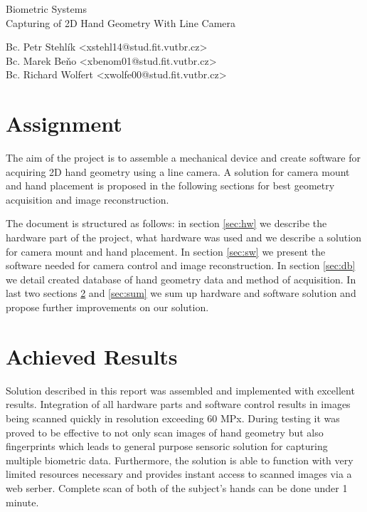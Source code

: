 \documentclass[11pt,a4paper]{article}
\begin{document}
\begin{center}
	\LARGE{Biometric Systems}\\
	\Large{Capturing of 2D Hand Geometry With Line Camera}
	\vspace{0.5cm}

    \begin{centering}
    \small{
        Bc. Petr Stehlík <xstehl14@stud.fit.vutbr.cz>\\
        Bc. Marek Beňo <xbenom01@stud.fit.vutbr.cz>\\
        Bc. Richard Wolfert <xwolfe00@stud.fit.vutbr.cz>\\
        }
    \end{centering}

	\vspace{0.2cm}

\end{center}

\section{Assignment}
The aim of the project is to assemble a mechanical device and create software for acquiring 2D hand geometry using a line camera.
A solution for camera mount and hand placement is proposed in the following sections for best geometry acquisition and image reconstruction.

The document is structured as follows: in section \ref{sec:hw} we describe the hardware part of the project, what hardware was used
and we describe a solution for camera mount and hand placement. In section \ref{sec:sw} we present the software needed for camera control and image reconstruction.
In section \ref{sec:db} we detail created database of hand geometry data and method of acquisition. In last two sections \ref{sec:res}
and \ref{sec:sum} we sum up hardware and software solution and propose further improvements on our solution.








\section{Achieved Results}
\label{sec:res}
Solution described in this report was assembled and implemented with excellent results. Integration of all hardware parts and software control results
in images being scanned quickly in resolution exceeding 60 MPx. During testing it was proved to be effective to not only scan images
of hand geometry but also fingerprints which leads to general purpose sensoric solution for capturing multiple biometric data. Furthermore,
the solution is able to function with very limited resources necessary and provides instant access to scanned images via a web serber. Complete scan of both of the subject's
hands can be done under 1 minute.
\end{document}
